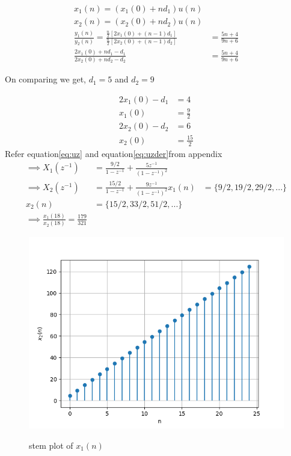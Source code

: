 \documentclass[a4,12pt,onecolumn]{IEEEtran}
\begin{document}
\begin{align}
x_1(n)=(x_1(0)+nd_1)u(n)
\label{eq:1}\\
x_2(n)=(x_2(0)+nd_2)u(n)
\label{eq:2}\\
\frac{y_1(n)}{y_2(n)}=\frac{\frac{n}{2}\left[ 2x_1(0) +(n-1)d_1 \right]}{\frac{n}{2}\left[ 2x_2(0) +(n-1)d_2 \right]}&= \frac{5n+4}{9n+6}\\
\frac{2x_1(0) +nd_1-d_1}{2x_2(0) +nd_2-d_2 }&= \frac{5n+4}{9n+6}
\end{align}
\begin{center}
On comparing we get, $ d_1 = 5 $ and $ d_2 = 9$ \\
\end{center}
\begin{align}
2x_1(0) - d_1 &= 4\\
x_1(0) &=\frac{9}{2}\\
2x_2(0)- d_2&=6\\
x_2(0) &=\frac{15}{2}
\end{align}
Refer equation\eqref{eq:uz}  and equation\eqref{eq:uzder}from appendix
\begin{align}
   \implies X_1(z^{-1}) &=\frac{9/2}{1-z^{-1}} + \frac{ 5z^{-1}}{(1-z^{-1})^2}\\
    \implies X_2(z^{-1})&= \frac{15/2}{1-z^{-1}} + \frac{9z^{-1}}{(1-z^{-1})^2}

x_1(n)&= \lbrace 9/2,19/2,29/2,...\rbrace \\

x_2(n)&= \lbrace 15/2,33/2,51/2,...\rbrace \\

\implies \frac{x_1(18)}{x_2(18)}=\frac{179}{321}
\end{align}
\begin{figure}[h!]
	\centering
	\includegraphics[width=\columnwidth]{ncert-maths/11/9/2/9/figs/fig1.png}
	\label{fig:plot}
	\caption{\large{stem plot of $x_1(n)$}}
\end{figure}
\end{document}
